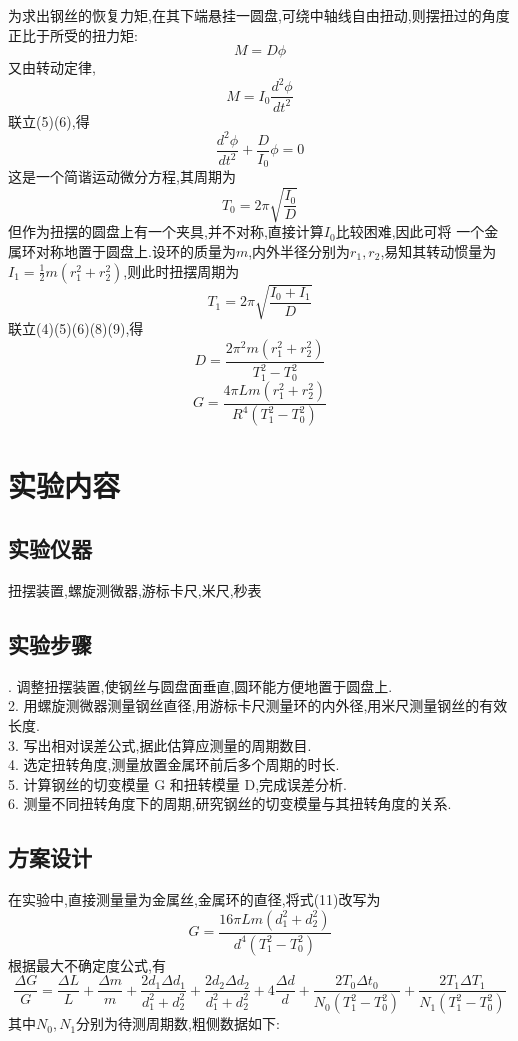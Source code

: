 \documentclass[12pt,a4paper,oneside]{ctexart}
\begin{document}
为求出钢丝的恢复力矩,在其下端悬挂一圆盘,可绕中轴线自由扭动,则摆扭过的角度正比于所受的扭力矩:
\begin{equation}
    M=D\phi
\end{equation}
又由转动定律,
\begin{equation}
    M=I_0\dfrac{d^2\phi}{dt^2}
\end{equation}
联立(5)(6),得
\begin{equation}
    \dfrac{d^2\phi}{dt^2}+\dfrac{D}{I_0}\phi=0
\end{equation}
这是一个简谐运动微分方程,其周期为
\begin{equation}
    T_0=2\pi\sqrt{\dfrac{I_0}{D}}
\end{equation}
但作为扭摆的圆盘上有一个夹具,并不对称,直接计算$I_0$比较困难,因此可将
一个金属环对称地置于圆盘上.设环的质量为$m$,内外半径分别为$r_1,r_2$,易知其转动惯量为
$I_1=\frac{1}{2}m(r_1^2+r_2^2)$,则此时扭摆周期为
\begin{equation}
    T_1=2\pi\sqrt{\dfrac{I_0+I_1}{D}}
\end{equation}
联立(4)(5)(6)(8)(9),得
\begin{equation}
    D=\dfrac{2\pi^2m(r_1^2+r_2^2)}{T_1^2-T_0^2}
\end{equation}
\begin{equation}
    G=\dfrac{4\pi Lm(r_1^2+r_2^2)}{R^4(T_1^2-T_0^2)}
\end{equation}
\section{实验内容}
\subsection{实验仪器}
扭摆装置,螺旋测微器,游标卡尺,米尺,秒表
\subsection{实验步骤}. 调整扭摆装置,使钢丝与圆盘面垂直,圆环能方便地置于圆盘上.\\
2. 用螺旋测微器测量钢丝直径,用游标卡尺测量环的内外径,用米尺测量钢丝的有效长度.\\
3. 写出相对误差公式,据此估算应测量的周期数目.\\
4. 选定扭转角度,测量放置金属环前后多个周期的时长.\\
5. 计算钢丝的切变模量 G 和扭转模量 D,完成误差分析.\\
6. 测量不同扭转角度下的周期,研究钢丝的切变模量与其扭转角度的关系.
\subsection{方案设计}
在实验中,直接测量量为金属丝,金属环的直径,将式(11)改写为
\begin{equation}
    G=\dfrac{16\pi Lm(d_1^2+d_2^2)}{d^4(T_1^2-T_0^2)}
\end{equation}
根据最大不确定度公式,有
$$\dfrac{\Delta G}{G}=\dfrac{\Delta L}{L}+\dfrac{\Delta m}{m}
        +\dfrac{2d_1\Delta d_1}{d_1^2+d_2^2}+\dfrac{2d_2\Delta d_2}{d_1^2+d_2^2}
        +4\dfrac{\Delta d}{d}+\dfrac{2T_0\Delta t_0}{N_0(T_1^2-T_0^2)}+\dfrac{2T_1\Delta T_1}{N_1(T_1^2-T_0^2)}$$
其中$N_0,N_1$分别为待测周期数,粗侧数据如下:
\end{document}
